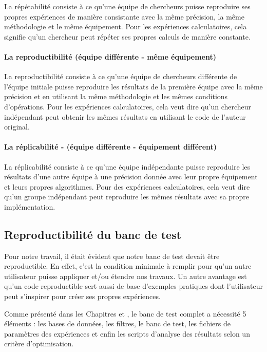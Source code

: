 La répétabilité consiste à ce qu'une équipe de chercheurs puisse reproduire ses propres expériences de manière consistante avec la même précision, la même méthodologie et le même équipement. Pour les expériences calculatoires, cela signifie qu'un chercheur peut répéter ses propres calculs de manière constante.


\paragraph{La reproductibilité (équipe différente - même équipement)}

La reproductibilité consiste à ce qu'une équipe de chercheurs différente de l'équipe initiale puisse reproduire les résultats de la première équipe avec la même précision et en utilisant la même méthodologie et les mêmes conditions d'opérations. Pour les expériences calculatoires, cela veut dire qu'un chercheur indépendant peut obtenir les mêmes résultats en utilisant le code de l'auteur original.

\paragraph{La réplicabilité - (équipe différente - équipement différent)}

La réplicabilité consiste à ce qu'une équipe indépendante puisse reproduire les résultats d'une autre équipe à une précision donnée avec leur propre équipement et leurs propres algorithmes. Pour des expériences calculatoires, cela veut dire qu'un groupe indépendant peut reproduire les mêmes résultats avec sa propre implémentation.

\subsection{Reproductibilité du banc de test}

Pour notre travail, il était évident que notre banc de test devait être reproductible. En effet, c'est la condition minimale à remplir pour qu'un autre utilisateur puisse appliquer et/ou étendre nos travaux. Un autre avantage est qu'un code reproductible sert aussi de base d'exemples pratiques dont l'utilisateur peut s'inspirer pour créer ses propres expériences.

Comme présenté dans les Chapitres \chapBenchN{} et \chapAnalysisN{}, le banc de test complet a nécessité 5 éléments : les bases de données, les filtres, le banc de test, les fichiers de paramètres des expériences et enfin les scripts d'analyse des résultats selon un critère d'optimisation.

